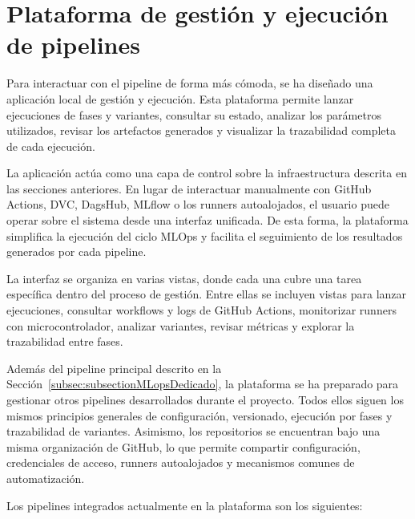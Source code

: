 \section{Plataforma de gestión y ejecución de pipelines}
\label{sec:plataforma-gestion-pipelines}

Para interactuar con el pipeline de forma más cómoda, se ha diseñado una aplicación local de gestión y ejecución. Esta plataforma permite lanzar ejecuciones de fases y variantes, consultar su estado, analizar los parámetros utilizados, revisar los artefactos generados y visualizar la trazabilidad completa de cada ejecución.

La aplicación actúa como una capa de control sobre la infraestructura descrita en las secciones anteriores. En lugar de interactuar manualmente con GitHub Actions, DVC, DagsHub, MLflow o los runners autoalojados, el usuario puede operar sobre el sistema desde una interfaz unificada. De esta forma, la plataforma simplifica la ejecución del ciclo MLOps y facilita el seguimiento de los resultados generados por cada pipeline.

La interfaz se organiza en varias vistas, donde cada una cubre una tarea específica dentro del proceso de gestión. Entre ellas se incluyen vistas para lanzar ejecuciones, consultar workflows y logs de GitHub Actions, monitorizar runners con microcontrolador, analizar variantes, revisar métricas y explorar la trazabilidad entre fases.

Además del pipeline principal descrito en la Sección~\ref{subsec:subsectionMLopsDedicado}, la plataforma se ha preparado para gestionar otros pipelines desarrollados durante el proyecto. Todos ellos siguen los mismos principios generales de configuración, versionado, ejecución por fases y trazabilidad de variantes. Asimismo, los repositorios se encuentran bajo una misma organización de GitHub, lo que permite compartir configuración, credenciales de acceso, runners autoalojados y mecanismos comunes de automatización.

Los pipelines integrados actualmente en la plataforma son los siguientes:

